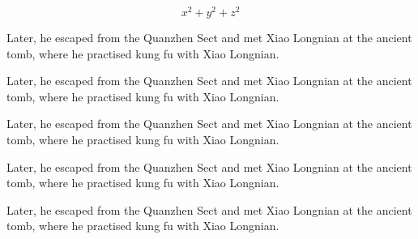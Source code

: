 \documentclass[print, doctor, vlined]{DissertUESTC}
\begin{document}
\begin{longtable}{p{2em} p{6em}}
	\end{longtable}
	

	\begin{equation}
		x^2 + y^2 + z^2
	\end{equation}
	


	\begin{Definition}[Name]
		Later, he escaped from the Quanzhen Sect and met Xiao Longnian at the ancient tomb, where he practised kung fu with Xiao Longnian.
	\end{Definition}

	\begin{Axiom}[Name]
		Later, he escaped from the Quanzhen Sect and met Xiao Longnian at the ancient tomb, where he practised kung fu with Xiao Longnian.
	\end{Axiom}
	
	\begin{Theorem}[Name]
		Later, he escaped from the Quanzhen Sect and met Xiao Longnian at the ancient tomb, where he practised kung fu with Xiao Longnian.
	\end{Theorem}
	
	\begin{Proposition}[Name]
		Later, he escaped from the Quanzhen Sect and met Xiao Longnian at the ancient tomb, where he practised kung fu with Xiao Longnian.
	\end{Proposition}
	
	\begin{Corollary}[Name]
		Later, he escaped from the Quanzhen Sect and met Xiao Longnian at the ancient tomb, where he practised kung fu with Xiao Longnian.
	\end{Corollary}
	
\end{document}
